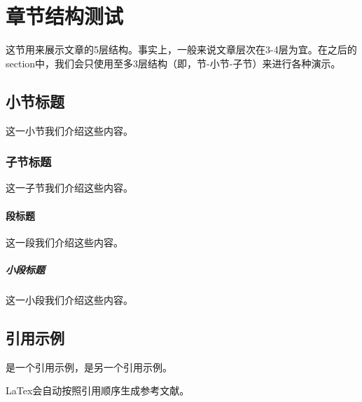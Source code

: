 \section{章节结构测试}这节用来展示文章的5层结构。事实上，一般来说文章层次在3-4层为宜。在之后的section中，我们会只使用至多3层结构（即，节-小节-子节）来进行各种演示。

\subsection{小节标题}这一小节我们介绍这些内容。

\subsubsection{子节标题}这一子节我们介绍这些内容。

\paragraph{段标题}这一段我们介绍这些内容。 

\subparagraph{小段标题}这一小段我们介绍这些内容。

\subsection{引用示例}

\cite{2006Robust}是一个引用示例，\cite{2003A}是另一个引用示例。

LaTex会自动按照引用顺序生成参考文献。